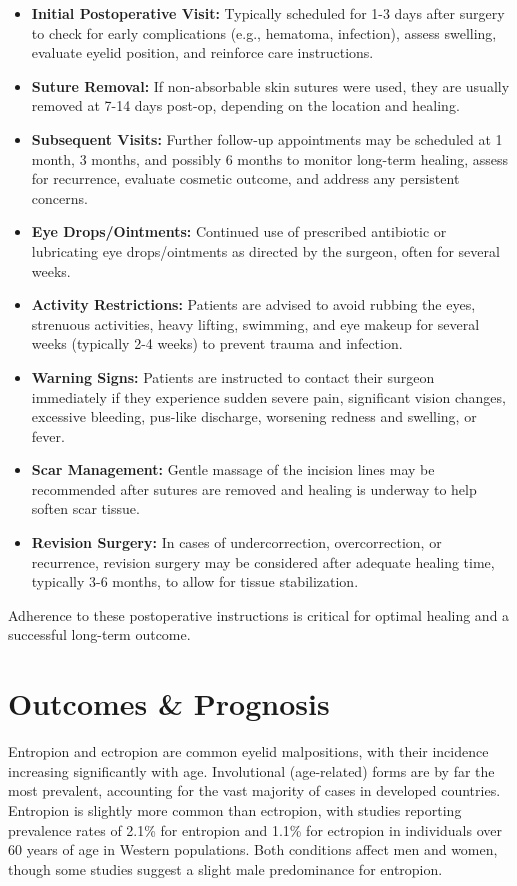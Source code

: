 \begin{itemize}
  \item \textbf{Initial Postoperative Visit:} Typically scheduled for 1-3 days after surgery to check for early complications (e.g., hematoma, infection), assess swelling, evaluate eyelid position, and reinforce care instructions.

  \item \textbf{Suture Removal:} If non-absorbable skin sutures were used, they are usually removed at 7-14 days post-op, depending on the location and healing.

  \item \textbf{Subsequent Visits:} Further follow-up appointments may be scheduled at 1 month, 3 months, and possibly 6 months to monitor long-term healing, assess for recurrence, evaluate cosmetic outcome, and address any persistent concerns.

  \item \textbf{Eye Drops/Ointments:} Continued use of prescribed antibiotic or lubricating eye drops/ointments as directed by the surgeon, often for several weeks.

  \item \textbf{Activity Restrictions:} Patients are advised to avoid rubbing the eyes, strenuous activities, heavy lifting, swimming, and eye makeup for several weeks (typically 2-4 weeks) to prevent trauma and infection.

  \item \textbf{Warning Signs:} Patients are instructed to contact their surgeon immediately if they experience sudden severe pain, significant vision changes, excessive bleeding, pus-like discharge, worsening redness and swelling, or fever.

  \item \textbf{Scar Management:} Gentle massage of the incision lines may be recommended after sutures are removed and healing is underway to help soften scar tissue.

  \item \textbf{Revision Surgery:} In cases of undercorrection, overcorrection, or recurrence, revision surgery may be considered after adequate healing time, typically 3-6 months, to allow for tissue stabilization.
\end{itemize}

Adherence to these postoperative instructions is critical for optimal healing and a successful long-term outcome.

\section*{Outcomes \& Prognosis}
Entropion and ectropion are common eyelid malpositions, with their incidence increasing significantly with age. Involutional (age-related) forms are by far the most prevalent, accounting for the vast majority of cases in developed countries. Entropion is slightly more common than ectropion, with studies reporting prevalence rates of 2.1\% for entropion and 1.1\% for ectropion in individuals over 60 years of age in Western populations. Both conditions affect men and women, though some studies suggest a slight male predominance for entropion. 

